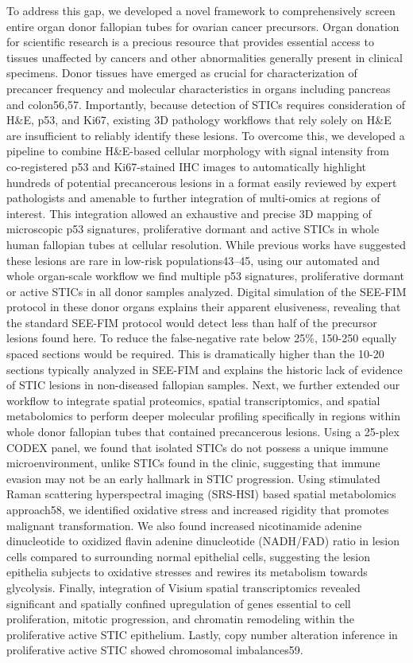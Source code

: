 \begin{refsection}
    To address this gap, we developed a novel framework to comprehensively screen entire organ donor fallopian tubes for ovarian cancer precursors. Organ donation for scientific research is a precious resource that provides essential access to tissues unaffected by cancers and other abnormalities generally present in clinical specimens. Donor tissues have emerged as crucial for characterization of precancer frequency and molecular characteristics in organs including pancreas and colon56,57. Importantly, because detection of STICs requires consideration of H\&E, p53, and Ki67, existing 3D pathology workflows that rely solely on H\&E are insufficient to reliably identify these lesions. To overcome this, we developed a pipeline to combine H\&E-based cellular morphology with signal intensity from co-registered p53 and Ki67-stained IHC images to automatically highlight hundreds of potential precancerous lesions in a format easily reviewed by expert pathologists and amenable to further integration of multi-omics at regions of interest. This integration allowed an exhaustive and precise 3D mapping of microscopic p53 signatures, proliferative dormant and active STICs in whole human fallopian tubes at cellular resolution.
    While previous works have suggested these lesions are rare in low-risk populations43–45, using our automated and whole organ-scale workflow we find multiple p53 signatures, proliferative dormant or active STICs in all donor samples analyzed. Digital simulation of the SEE-FIM protocol in these donor organs explains their apparent elusiveness, revealing that the standard SEE-FIM protocol would detect less than half of the precursor lesions found here. To reduce the false-negative rate below 25\%, 150-250 equally spaced sections would be required. This is dramatically higher than the 10-20 sections typically analyzed in SEE-FIM and explains the historic lack of evidence of STIC lesions in non-diseased fallopian samples.
    Next, we further extended our workflow to integrate spatial proteomics, spatial transcriptomics, and spatial metabolomics to perform deeper molecular profiling specifically in regions within whole donor fallopian tubes that contained precancerous lesions. Using a 25-plex CODEX panel, we found that isolated STICs do not possess a unique immune microenvironment, unlike STICs found in the clinic, suggesting that immune evasion may not be an early hallmark in STIC progression. Using stimulated Raman scattering hyperspectral imaging (SRS-HSI) based spatial metabolomics approach58, we identified oxidative stress and increased rigidity that promotes malignant transformation. We also found increased nicotinamide adenine dinucleotide to oxidized flavin adenine dinucleotide (NADH/FAD) ratio in lesion cells compared to surrounding normal epithelial cells, suggesting the lesion epithelia subjects to oxidative stresses and rewires its metabolism towards glycolysis. Finally, integration of Visium spatial transcriptomics revealed significant and spatially confined upregulation of genes essential to cell proliferation, mitotic progression, and chromatin remodeling within the proliferative active STIC epithelium. Lastly, copy number alteration inference in proliferative active STIC showed chromosomal imbalances59. 

\end{refsection}
